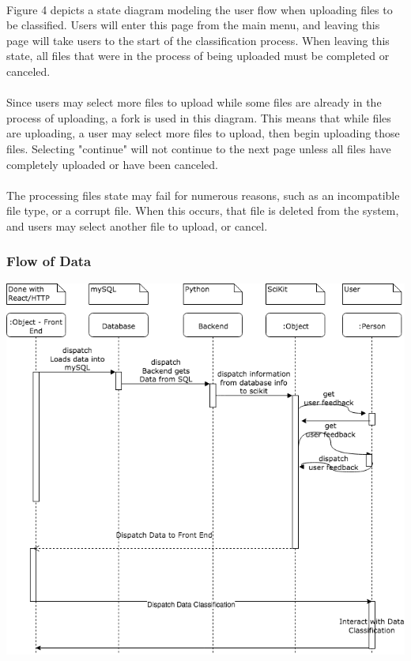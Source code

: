 \documentclass[12pt,oneside,letterpaper]{article}
\begin{document}
\paragraph{} Figure 4 depicts a state diagram modeling the user flow when uploading files to be classified. Users will enter this page from the main menu, and leaving this page will take users to the start of the classification process. When leaving this state, all files that were in the process of being uploaded must be completed or canceled.
\paragraph{} Since users may select more files to upload while some files are already in the process of uploading, a fork is used in this diagram. This means that while files are uploading, a user may select more files to upload, then begin uploading those files. Selecting "continue" will not continue to the next page unless all files have completely uploaded or have been canceled.
\paragraph{} The processing files state may fail for numerous reasons, such as an incompatible file type, or a corrupt file. When this occurs, that file is deleted from the system, and users may select another file to upload, or cancel.

\subsubsection{Flow of Data}
\includegraphics[scale = 0.52]{YarmSequenceDiagram.png}
\begingroup
{}
\endgroup
\end{document}

